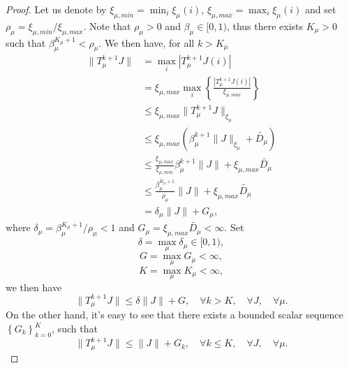 \documentclass[12pt,a4paper]{amsart}
\numberwithin{equation}{section}
\theoremstyle{plain}
\theoremstyle{definition}
\begin{document}
\begin{proof}
	Let us denote by $\xi_{\mu, min} = \min_{i} \xi_{\mu}(i)$, $\xi_{\mu, max} = \max_{i} \xi_{\mu}(i)$ and set $\rho_{\mu} = \xi_{\mu, min} / \xi_{\mu, max}$. Note that $\rho_{\mu} > 0$ and $\beta_{\mu} \in [0, 1)$, thus there exists $K_{\mu} > 0$ such that $\beta_{\mu}^{K_{\mu} +1 } < \rho_{\mu}$.  We then have, for all $k > K_{\mu}$
	$$
	\begin{aligned}
	\|T_{\mu}^{k+1}J\| & = \max_{i} |T_{\mu}^{k+1} J(i)| \\
	&  = \xi_{\mu, max} \max_{i} \left\{\frac{|T_{\mu}^{k+1}J(i)|}{\xi_{\mu, max}} \right\} \\
	& \le \xi_{\mu, max} \|T_{\mu}^{k+1}J\|_{\xi_{\mu}} \\
	& \le \xi_{\mu, max} \left( \beta_{\mu}^{k+1} \|J\|_{\xi_{\mu}}  + \tilde{D_{\mu}} \right) \\
	& \le \frac{\xi_{\mu, max}}{\xi_{\mu, min}} \beta_{\mu}^{k+1} \|J\| + \xi_{\mu, max} \tilde{D_{\mu}} \\
	& \le \frac{\beta_{\mu}^{K_{\mu} + 1}}{\rho_{\mu}} \|J\| + \xi_{\mu, max} \tilde{D_{\mu}} \\
	& = \delta_{\mu} \|J\| + G_{\mu},
	\end{aligned}
	$$
	where $\delta_{\mu} = \beta_{\mu}^{K_{\mu}+1} / \rho_{\mu} < 1$ and $G_{\mu} = \xi_{\mu, max} \tilde{D_{\mu}} < \infty$.  Set 
	$$
	\delta = \max_{\mu} \delta_{\mu} \in [0, 1),
	$$ 
	$$
	G = \max_{\mu} G_{\mu} < \infty,
	$$
	 $$
	 K= \max_{\mu} K_{\mu}  < \infty,
	 $$ 
	 we then have
	\begin{equation} \label{tmulargek}
	\|T_{\mu}^{k+1} J\| \le \delta \|J\| + G, \quad \forall k > K,\quad \forall J, \quad \forall \mu. 
	\end{equation}
	On the other hand, it's easy to see that there exists a bounded scalar sequence $\left\{G_k\right\}_{k=0}^{K}$, such that 
	\begin{equation} \label{tmusmallk}
		\|T_{\mu}^{k+1} J\| \le \|J\| + G_k, \quad \forall k \le K,\quad \forall J, \quad \forall \mu. 
	\end{equation}
	

\end{proof}
\end{document}

